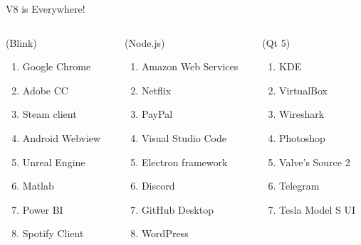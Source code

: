 \begin{frame}{V8 is Everywhere!}
    \begin{columns}
        \begin{column}{0.33\textwidth}
            (Blink)
            \begin{enumerate}
                \item Google Chrome
                \item Adobe CC
                \item Steam client
                \item Android Webview
                \item Unreal Engine
                \item Matlab
                \item Power BI
                \item Spotify Client
            \end{enumerate}
        \end{column}
        \begin{column}{0.34\textwidth}
            (Node.js)
            \begin{enumerate}
                \item Amazon Web Services
                \item Netflix
                \item PayPal 
                \item Visual Studio Code
                \item Electron framework
                \item Discord
                \item GitHub Desktop
                \item WordPress
            \end{enumerate}
        \end{column}
        \begin{column}{0.33\textwidth}
            (Qt 5)
            \begin{enumerate}
                \item KDE
                \item VirtualBox
                \item Wireshark
                \item Photoshop
                \item Valve's Source 2
                \item Telegram
                \item Tesla Model S UI

\end{enumerate}
\end{column}
\end{columns}
\end{frame}
